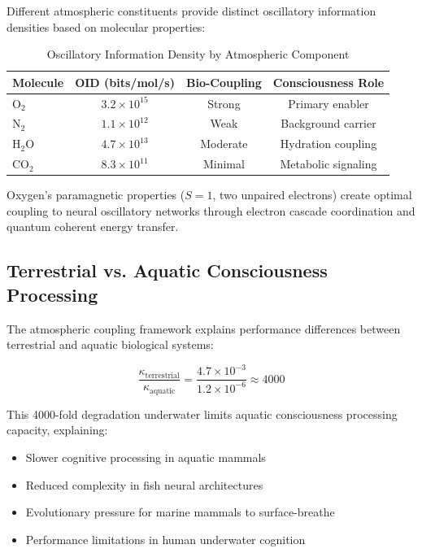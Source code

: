 \documentclass[12pt]{article}
\theoremstyle{remark}
\begin{document}
Different atmospheric constituents provide distinct oscillatory information densities based on molecular properties:

\begin{table}[H]
\centering
\caption{Oscillatory Information Density by Atmospheric Component}
\begin{tabular}{lccc}
\toprule
\textbf{Molecule} & \textbf{OID (bits/mol/s)} & \textbf{Bio-Coupling} & \textbf{Consciousness Role} \\
\midrule
O$_2$ & $3.2 \times 10^{15}$ & Strong & Primary enabler \\
N$_2$ & $1.1 \times 10^{12}$ & Weak & Background carrier \\
H$_2$O & $4.7 \times 10^{13}$ & Moderate & Hydration coupling \\
CO$_2$ & $8.3 \times 10^{11}$ & Minimal & Metabolic signaling \\
\bottomrule
\end{tabular}
\end{table}

Oxygen's paramagnetic properties ($S = 1$, two unpaired electrons) create optimal coupling to neural oscillatory networks through electron cascade coordination and quantum coherent energy transfer.

\subsection{Terrestrial vs. Aquatic Consciousness Processing}

The atmospheric coupling framework explains performance differences between terrestrial and aquatic biological systems:

\begin{equation}
\frac{\kappa_{\text{terrestrial}}}{\kappa_{\text{aquatic}}} = \frac{4.7 \times 10^{-3}}{1.2 \times 10^{-6}} \approx 4000
\end{equation}

This 4000-fold degradation underwater limits aquatic consciousness processing capacity, explaining:
\begin{itemize}
\item Slower cognitive processing in aquatic mammals
\item Reduced complexity in fish neural architectures
\item Evolutionary pressure for marine mammals to surface-breathe
\item Performance limitations in human underwater cognition
\end{itemize}
\end{document}
